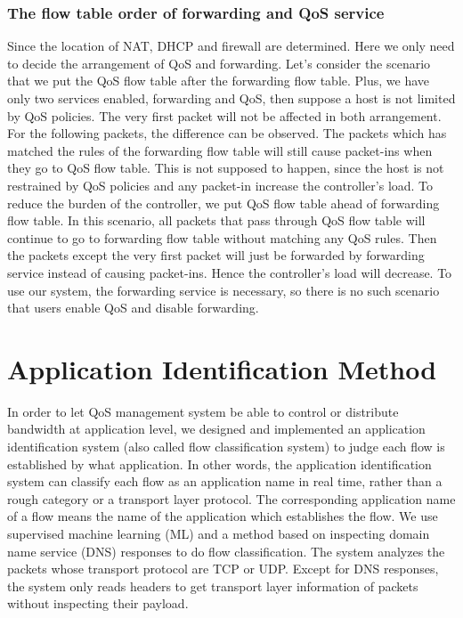 \documentclass[journal]{IEEEtran}
\begin{document}
\subsubsection{The flow table order of forwarding and QoS service}
Since the location of NAT, DHCP and firewall are determined. Here we only need to decide the arrangement of QoS and forwarding.
Let's consider the scenario that we put the QoS flow table after the forwarding flow table. Plus, we have only two services enabled, forwarding and QoS, then suppose a host is not limited by QoS policies. The very first packet will not be affected in both arrangement. For the following packets, the difference can be observed. The packets which has matched the rules of the forwarding flow table will still cause packet-ins when they go to QoS flow table. This is not supposed to happen, since the host is not restrained by QoS policies and any packet-in increase the controller's load.
To reduce the burden of the controller, we put QoS flow table ahead of forwarding flow table. In this scenario, all packets that pass through QoS flow table will continue to go to forwarding flow table without matching any QoS rules. Then the packets except the very first packet will just be forwarded by forwarding service instead of causing packet-ins. Hence the controller's load will decrease. To use our system, the forwarding service is necessary, so there is no such scenario that users enable QoS and disable forwarding.






\section{Application Identification Method}\label{sec:app_identification}
In order to let QoS management system be able to control or distribute bandwidth at application level,
we designed and implemented an application identification system (also called flow classification system)
to judge each flow is established by what application.
In other words, the application identification system can classify each flow as an application name in real time,
rather than a rough category or a transport layer protocol.
The corresponding application name of a flow means the name of the application which establishes the flow.
We use supervised machine learning (ML) and a method based on inspecting domain name service (DNS) responses to do flow classification.
The system analyzes the packets whose transport protocol are TCP or UDP.
Except for DNS responses, the system only reads headers to get transport layer information of
packets without inspecting their payload.
\end{document}
